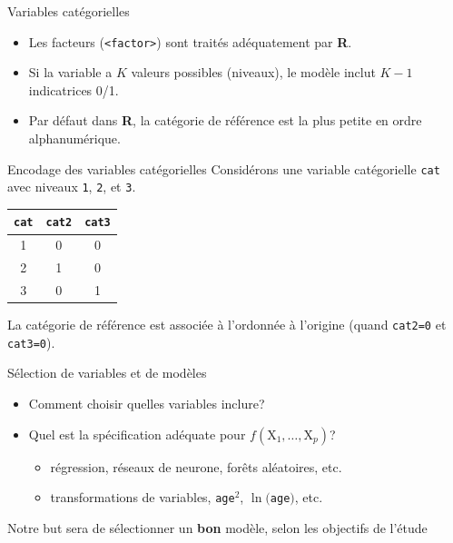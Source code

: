 \documentclass[
  ignorenonframetext,
]{beamer}
\providecommand{\tightlist}{%
  \setlength{\itemsep}{0pt}\setlength{\parskip}{0pt}}\usepackage{longtable,booktabs,array}
\begin{document}
\begin{frame}[fragile]{Variables catégorielles}
\protect\hypertarget{variables-catuxe9gorielles}{}
\begin{itemize}
\tightlist
\item
  Les facteurs (\texttt{\textless{}factor\textgreater{}}) sont traités
  adéquatement par \textbf{R}.
\item
  Si la variable a \(K\) valeurs possibles (niveaux), le modèle inclut
  \(K-1\) indicatrices 0/1.
\item
  Par défaut dans \textbf{R}, la catégorie de référence est la plus
  petite en ordre alphanumérique.
\end{itemize}
\end{frame}

\begin{frame}[fragile]{Encodage des variables catégorielles}
\protect\hypertarget{encodage-des-variables-catuxe9gorielles}{}
Considérons une variable catégorielle \texttt{cat} avec niveaux
\texttt{1}, \texttt{2}, et \texttt{3}.

\begin{longtable}[]{@{}ccc@{}}
\toprule()
\texttt{cat} & \texttt{cat2} & \texttt{cat3} \\
\midrule()
\endhead
1 & 0 & 0 \\
2 & 1 & 0 \\
3 & 0 & 1 \\
\bottomrule()
\end{longtable}

La catégorie de référence est associée à l'ordonnée à l'origine (quand
\texttt{cat2=0} et \texttt{cat3=0}).
\end{frame}

\begin{frame}[fragile]{Sélection de variables et de modèles}
\protect\hypertarget{suxe9lection-de-variables-et-de-moduxe8les}{}
\begin{itemize}
\tightlist
\item
  Comment choisir quelles variables inclure?
\item
  Quel est la spécification adéquate pour
  \(f(\mathrm{X}_1, \ldots, \mathrm{X}_p)\)?

  \begin{itemize}
  \tightlist
  \item
    régression, réseaux de neurone, forêts aléatoires, etc.
  \item
    transformations de variables, \texttt{age}\({}^2\),
    \(\ln(\)\texttt{age}\()\), etc.
  \end{itemize}
\end{itemize}

Notre but sera de sélectionner un \textbf{bon} modèle, selon les
objectifs de l'étude
\end{frame}
\end{document}
